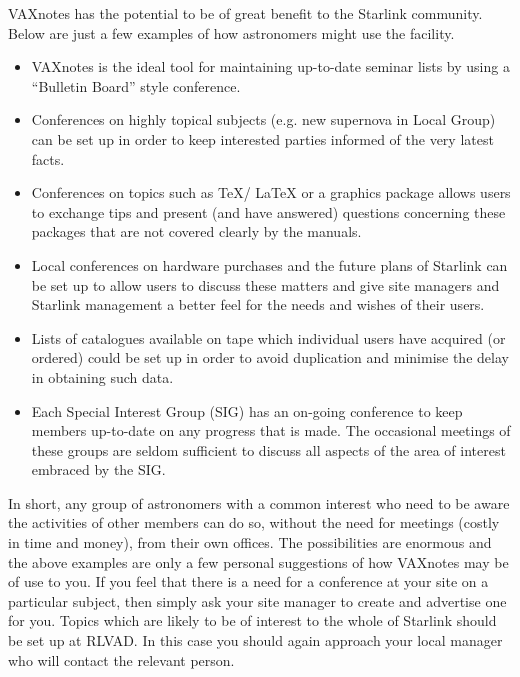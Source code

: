 VAXnotes has the potential to be of great benefit to the Starlink community.
Below are just a few examples of how astronomers might use the facility.

\begin{itemize} 

\item VAXnotes is the ideal tool for maintaining up-to-date seminar lists by
using a ``Bulletin Board'' style conference. 

\item Conferences on highly topical subjects (e.g. new supernova in Local Group)
can be set up in  order to keep interested parties informed of the very latest
facts. 

\item Conferences on topics such as \TeX / \LaTeX { } or a graphics package
allows users to exchange tips and present (and have answered) questions
concerning these packages that are not covered clearly by the manuals. 

\item Local conferences on hardware purchases and the future plans of Starlink
can be set up to allow users to discuss these matters and give site managers
and Starlink management a better feel for the needs and wishes of their users. 

\item Lists of catalogues available on tape which individual users have
acquired (or ordered) could be set up in order to avoid duplication and
minimise the delay in obtaining such data. 

\item Each Special Interest Group (SIG) has an on-going conference to keep
members up-to-date on any progress that is made. The occasional meetings of
these groups are seldom sufficient to discuss all aspects of the area of
interest embraced by the SIG. 

\end{itemize} 

In short, any group of astronomers with a common interest who need to be aware
the activities of other members can do so, without the need for meetings
(costly in time and money), from their own offices. The possibilities
are enormous and the above examples are only a few personal suggestions of how
VAXnotes may be of use to you. If you feel that there is a need for a
conference at your site on a particular subject, then simply ask your site
manager to create and advertise one for you. Topics which are likely to be of
interest to the whole of Starlink should be set up at RLVAD. In this case you
should again approach your local manager who will contact the relevant person. 


